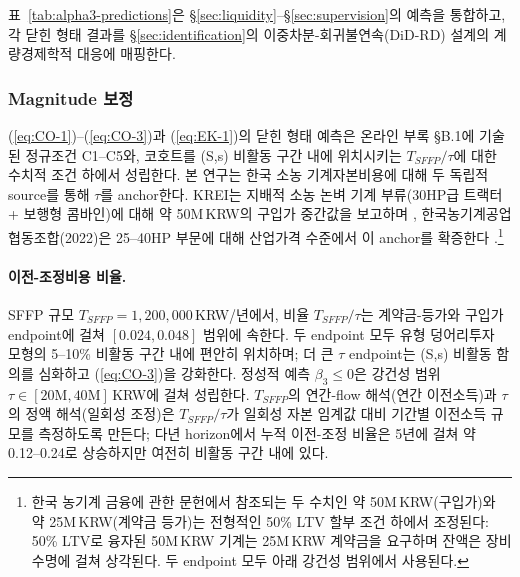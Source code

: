 \documentclass[12pt, a4paper]{article}
\begin{document}
표~\ref{tab:alpha3-predictions}은 \S\ref{sec:liquidity}--\S\ref{sec:supervision}의 예측을 통합하고, 각 닫힌 형태 결과를 \S\ref{sec:identification}의 이중차분-회귀불연속(DiD-RD) 설계의 계량경제학적 대응에 매핑한다.

\subsubsection*{Magnitude 보정}
\label{sec:calibration}

(\ref{eq:CO-1})--(\ref{eq:CO-3})과 (\ref{eq:EK-1})의 닫힌 형태 예측은 온라인 부록 \S B.1에 기술된 정규조건 C1--C5와, 코호트를 (S,s) 비활동 구간 내에 위치시키는 $T_{SFFP}/\tau$에 대한 수치적 조건 하에서 성립한다. 본 연구는 한국 소농 기계자본비용에 대해 두 독립적 source를 통해 $\tau$를 anchor한다. KREI는 지배적 소농 논벼 기계 부류(30HP급 트랙터 + 보행형 콤바인)에 대해 약 50M\,KRW의 구입가 중간값을 보고하며 \citep{KREI_prodcost_2022}, 한국농기계공업협동조합(2022)은 25--40HP 부문에 대해 산업가격 수준에서 이 anchor를 확증한다 \citep{KAMICO_pricelist_2022}.\footnote{한국 농기계 금융에 관한 문헌에서 참조되는 두 수치인 약 50M\,KRW(구입가)와 약 25M\,KRW(계약금 등가)는 전형적인 50\% LTV 할부 조건 하에서 조정된다: 50\% LTV로 융자된 50M\,KRW 기계는 25M\,KRW 계약금을 요구하며 잔액은 장비 수명에 걸쳐 상각된다. 두 endpoint 모두 아래 강건성 범위에서 사용된다.}

\paragraph{이전-조정비용 비율.} SFFP 규모 $T_{SFFP} = 1{,}200{,}000$\,KRW/년에서, 비율 $T_{SFFP}/\tau$는 계약금-등가와 구입가 endpoint에 걸쳐 $[0.024, 0.048]$ 범위에 속한다. 두 endpoint 모두 \citet{CaballeroEngel1999_lumpy} 유형 덩어리투자 모형의 5--10\% 비활동 구간 내에 편안히 위치하며; 더 큰 $\tau$ endpoint는 (S,s) 비활동 함의를 심화하고 (\ref{eq:CO-3})을 강화한다. 정성적 예측 $\beta_3 \le 0$은 강건성 범위 $\tau \in [20\text{M}, 40\text{M}]$\,KRW에 걸쳐 성립한다. $T_{SFFP}$의 연간-flow 해석(연간 이전소득)과 $\tau$의 정액 해석(일회성 조정)은 $T_{SFFP}/\tau$가 일회성 자본 임계값 대비 기간별 이전소득 규모를 측정하도록 만든다; 다년 horizon에서 누적 이전-조정 비율은 5년에 걸쳐 약 0.12--0.24로 상승하지만 여전히 비활동 구간 내에 있다.
\end{document}
